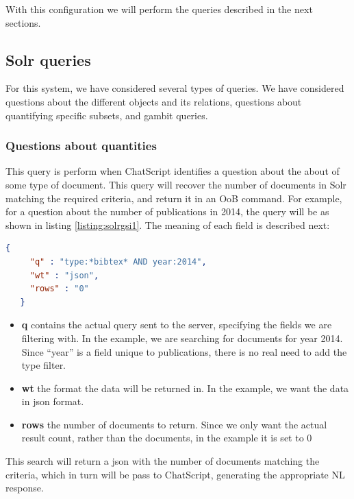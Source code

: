 With this configuration we will perform the queries described in the next sections.

\subsection{Solr queries}

For this system, we have considered several types of queries. We have considered questions about the different objects and its relations, questions about quantifying specific subsets, and gambit queries. 

\subsubsection{Questions about quantities}

This query is perform when ChatScript identifies a question about the about of some type of document. This query will recover the number of documents in Solr matching the required criteria, and return it in an \ac{OoB} command. For example, for a question about the number of publications in 2014, the query will be as shown in listing \ref{listing:solrgsi1}. The meaning of each field is described next:

\begin{center} 
  \begin{lstlisting}[language=json, caption=Example json query for Solr, label=listing:solrgsi1]
   {
     "q" : "type:*bibtex* AND year:2014",
     "wt" : "json",
     "rows" : "0"
   }  
  \end{lstlisting}
\end{center}

\begin{itemize}
  \item \textbf{q} contains the actual query sent to the server, specifying the fields we are filtering with. In the example, we are searching for documents for year 2014. Since ``year'' is a field unique to publications, there is no real need to add the type filter.
  \item \textbf{wt} the format the data will be returned in. In the example, we want the data in json format.
  \item \textbf{rows} the number of documents to return. Since we only want the actual result count, rather than the documents, in the example it is set to 0
\end{itemize}

This search will return a json with the number of documents matching the criteria, which in turn will be pass to ChatScript, generating the appropriate \ac{NL} response.

